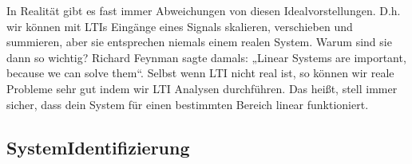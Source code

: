 \documentclass[letterpaper,10pt,english]{jupyterBook}
\begin{document}
\sphinxAtStartPar
In Realität gibt es fast immer Abweichungen von diesen Idealvorstellungen. D.h. wir können mit LTIs Eingänge eines Signals skalieren, verschieben und summieren, aber sie entsprechen niemals einem realen System. Warum sind sie dann so wichtig? Richard Feynman sagte damals: „Linear Systems are important, because we can solve them“.
Selbst wenn LTI nicht real ist, so können wir reale Probleme sehr gut  indem wir LTI Analysen durchführen.
Das heißt, stell immer sicher, dass dein System für einen bestimmten Bereich linear funktioniert.

\sphinxAtStartPar
{}


\subsection{System\sphinxhyphen{}Identifizierung}
\label{\detokenize{content/5_LTI:system-identifizierung}}
\sphinxAtStartPar
\end{document}
